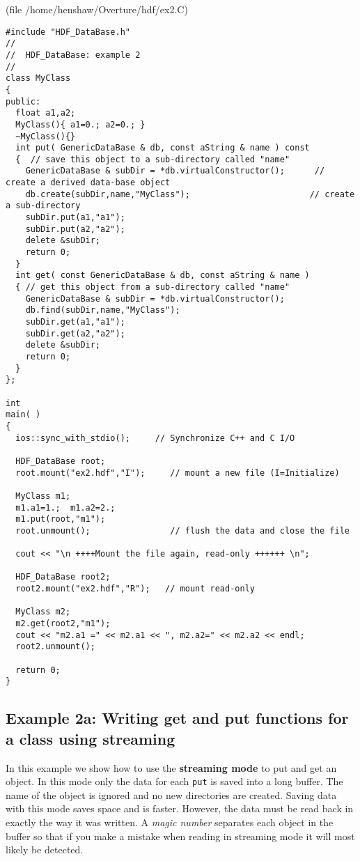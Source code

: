 \documentclass{article}
\begin{document}
(file {\ff /home/henshaw/Overture/hdf/ex2.C})
{\footnotesize
\begin{verbatim}
#include "HDF_DataBase.h"
//
//  HDF_DataBase: example 2
//
class MyClass
{
public:
  float a1,a2;
  MyClass(){ a1=0.; a2=0.; } 
  ~MyClass(){} 
  int put( GenericDataBase & db, const aString & name ) const
  {  // save this object to a sub-directory called "name"
    GenericDataBase & subDir = *db.virtualConstructor();      // create a derived data-base object
    db.create(subDir,name,"MyClass");                        // create a sub-directory 
    subDir.put(a1,"a1");
    subDir.put(a2,"a2");
    delete &subDir;
    return 0;
  }
  int get( const GenericDataBase & db, const aString & name ) 
  { // get this object from a sub-directory called "name"
    GenericDataBase & subDir = *db.virtualConstructor();
    db.find(subDir,name,"MyClass");
    subDir.get(a1,"a1");
    subDir.get(a2,"a2");
    delete &subDir;
    return 0;
  }
};

int
main( ) 
{
  ios::sync_with_stdio();     // Synchronize C++ and C I/O 

  HDF_DataBase root;
  root.mount("ex2.hdf","I");     // mount a new file (I=Initialize)

  MyClass m1;
  m1.a1=1.;  m1.a2=2.;
  m1.put(root,"m1");
  root.unmount();                // flush the data and close the file
    
  cout << "\n ++++Mount the file again, read-only ++++++ \n";

  HDF_DataBase root2;
  root2.mount("ex2.hdf","R");   // mount read-only

  MyClass m2;
  m2.get(root2,"m1");
  cout << "m2.a1 =" << m2.a1 << ", m2.a2=" << m2.a2 << endl;
  root2.unmount();

  return 0;
}

\end{verbatim}
}


\vfill\eject
\subsection{Example 2a: Writing get and put functions for a class using streaming}

In this example we show how to use the {\bf streaming mode} to put and get an object.
In this mode only the data for each {\tt put} is saved into a long buffer. The name
of the object is ignored and no new directories are created. 
Saving data with this mode saves space and is faster. However, the data must be read
back in exactly the way it was written. A {\sl magic number} separates each object
in the buffer so that if you make a mistake when reading in streaming mode it will
most likely be detected.
\end{document}
